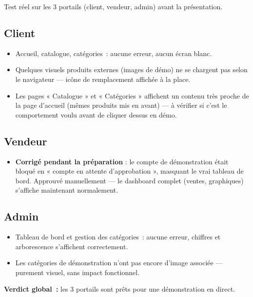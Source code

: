 \documentclass[11pt]{article}
\newcommand{\fait}[1]{\item[\textcolor{okgreen}{\textbf{\checkmark}}] #1}
\newcommand{\reste}[1]{\item[\textcolor{warnred}{\textbf{!}}] #1}
\newcommand{\info}[1]{\item[\textcolor{graytext}{\textbf{i}}] #1}
\begin{document}
Test réel sur les 3 portails (client, vendeur, admin) avant la présentation.

\subsection*{Client}
\begin{itemize}
\fait{Accueil, catalogue, catégories~: aucune erreur, aucun écran blanc.}
\reste{Quelques visuels produits externes (images de démo) ne se chargent pas selon le navigateur — icône de remplacement affichée à la place.}
\reste{Les pages « Catalogue » et « Catégories » affichent un contenu très proche de la page d'accueil (mêmes produits mis en avant) — à vérifier si c'est le comportement voulu avant de cliquer dessus en démo.}
\end{itemize}

\subsection*{Vendeur}
\begin{itemize}
\reste{\textbf{Corrigé pendant la préparation} : le compte de démonstration était bloqué en « compte en attente d'approbation », masquant le vrai tableau de bord. Approuvé manuellement — le dashboard complet (ventes, graphiques) s'affiche maintenant normalement.}
\end{itemize}

\subsection*{Admin}
\begin{itemize}
\fait{Tableau de bord et gestion des catégories~: aucune erreur, chiffres et arborescence s'affichent correctement.}
\info{Les catégories de démonstration n'ont pas encore d'image associée — purement visuel, sans impact fonctionnel.}
\end{itemize}

\vspace{0.5cm}
\noindent\textbf{Verdict global~:} les 3 portails sont prêts pour une démonstration en direct.
\end{document}
